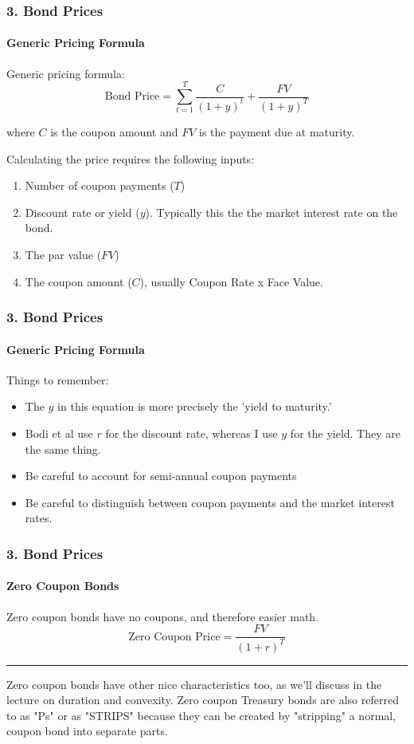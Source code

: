 \documentclass{beamer}
\begin{document}
\begin{frame}
    \frametitle{3. Bond Prices}
    \framesubtitle{Generic Pricing Formula}

    Generic pricing formula:
    $$
    \text{Bond Price} = \sum_{t=1}^{T} \frac{C}{(1 + y)^t} + \frac{FV}{(1 + y)^T}
    $$

    where $C$ is the coupon amount and $FV$ is the payment due at maturity.\\
    \vspace{1em}

    Calculating the price requires the following inputs:
    \begin{enumerate}
        \item Number of coupon payments ($T$)
        \item Discount rate or yield ($y$).   Typically this the the market interest rate on the bond.
        \item The par value ($FV$)
        \item The coupon amount ($C$), usually Coupon Rate x Face Value.
    \end{enumerate}

\end{frame}

\begin{frame}[t]
    \frametitle{3. Bond Prices}
    \framesubtitle{Generic Pricing Formula}

    Things to remember:
    \begin{itemize}
        \item The $y$ in this equation is more precisely the 'yield to maturity.'
        \item Bodi et al use $r$ for the discount rate, 
    whereas I use $y$ for the yield.   They are the same thing. 
        \item  Be careful to account for semi-annual coupon payments
        \item Be careful to distinguish between coupon payments and 
    the market interest rates.
    \end{itemize}

\end{frame}

\begin{frame}[t]
    \frametitle{3. Bond Prices}
    \framesubtitle{Zero Coupon Bonds}

    Zero coupon bonds have no coupons, and therefore easier math. \\
    $$\text{Zero Coupon Price} = \frac{FV}{(1 + r)^T}$$  
    \vspace{4em}
    \vfill
    \rule{0.3\textwidth}{0.4pt}
    \scriptsize

    Zero coupon bonds have other nice characteristics too, as we'll discuss in the lecture on duration and convexity.  
    Zero coupon Treasury bonds are also referred to as "Ps" or as "STRIPS" because they can be created by "stripping" a normal, coupon bond into separate parts.\\

\end{frame}
\end{document}
